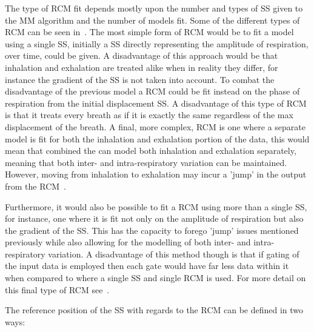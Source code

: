                The type of \gls{RCM} fit depends mostly upon the number and types of \gls{SS} given to the \gls{MM} algorithm and the number of models fit. Some of the different types of \gls{RCM} can be seen in~. The most simple form of \gls{RCM} would be to fit a model using a single \gls{SS}, initially a \gls{SS} directly representing the amplitude of respiration, over time, could be given. A disadvantage of this approach would be that inhalation and exhalation are treated alike when in reality they differ, for instance the gradient of the \gls{SS} is not taken into account. To combat the disadvantage of the previous model a \gls{RCM} could be fit instead on the phase of respiration from the initial displacement \gls{SS}. A disadvantage of this type of \gls{RCM} is that it treats every breath as if it is exactly the same regardless of the max displacement of the breath. A final, more complex, \gls{RCM} is one where a separate model is fit for both the inhalation and exhalation portion of the data, this would mean that combined the  can model both inhalation and exhalation separately, meaning that both inter- and intra-respiratory variation can be maintained. However, moving from inhalation to exhalation may incur a 'jump' in the output from the \gls{RCM}~.
                
                Furthermore, it would also be possible to fit a \gls{RCM} using more than a single \gls{SS}, for instance, one where it is fit not only on the amplitude of respiration but also the gradient of the \gls{SS}. This has the capacity to forego 'jump' issues mentioned previously while also allowing for the modelling of both inter- and intra-respiratory variation. A disadvantage of this method though is that if gating of the input data is employed then each gate would have far less data within it when compared to where a single \gls{SS} and single \gls{RCM} is used. For more detail on this final type of \gls{RCM} see~.
                
                The reference position of the \gls{SS} with regards to the \gls{RCM} can be defined in two ways:
            
